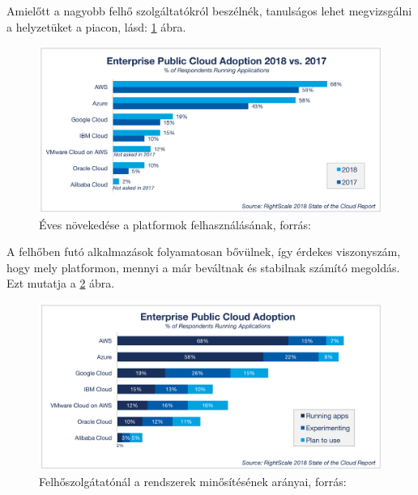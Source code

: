 \documentclass[12pt,oneside,justify,table]{book}
\begin{document}
Amielőtt a nagyobb felhő szolgáltatókról beszélnék, tanulságos lehet megvizsgálni a helyzetüket a piacon, lásd: \ref{fig:CloudAdoption2017-2018} ábra.
\begin{figure}[H]
\centering
\includegraphics[width=1\textwidth]{22-Cloud-Computing-Trends-Enterprise-Public-Cloud-Adoption-2018-vs-2017.png}
\caption{Éves növekedése a platformok felhasználásának, forrás: \cite{RightScale}}
\label{fig:CloudAdoption2017-2018}
\end{figure}

A felhőben futó alkalmazások folyamatosan bővülnek, így érdekes viszonyszám, hogy mely platformon, mennyi a már beváltnak és stabilnak számító megoldás. Ezt mutatja a \ref{fig:CloudTrends2018} ábra. 
\begin{figure}[H]
\centering
\includegraphics[width=1\textwidth]{23-Cloud-Computing-Trends-Enterprise-Public-Cloud-Adoption.png}
\caption{Felhőszolgátatónál a rendszerek minősítésének arányai, forrás: \cite{RightScale}}
\label{fig:CloudTrends2018}
\end{figure}
\end{document}
